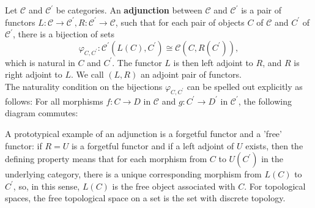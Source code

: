 Let $\mathcal{C}$ and $\mathcal{C}^{\prime}$ be categories. An \textbf{adjunction} between $\mathcal{C}$ and $\mathcal{C}^{\prime}$ is a pair of functors $L: \mathcal{C} \rightarrow \mathcal{C}^{\prime}, R: \mathcal{C}^{\prime} \rightarrow \mathcal{C}$, such that for each pair of objects $C$ of $\mathcal{C}$ and $C^{\prime}$ of $\mathcal{C}^{\prime}$, there is a bijection of sets
$$
\varphi_{C, C^{\prime}}: \mathcal{C}^{\prime}\left(L(C), C^{\prime}\right) \cong \mathcal{C}\left(C, R\left(C^{\prime}\right)\right),
$$
which is natural in $C$ and $C^{\prime}$. The functor $L$ is then left adjoint to $R$, and $R$ is right adjoint to $L$. We call $(L, R)$ an adjoint pair of functors.\\
The naturality condition on the bijections $\varphi_{C, C^{\prime}}$ can be spelled out explicitly as follows: For all morphisms $f: C \rightarrow D$ in $\mathcal{C}$ and $g: C^{\prime} \rightarrow D^{\prime}$ in $\mathcal{C}^{\prime}$, the following diagram commutes:
\begin{center}
\end{center}


\begin{example}
A prototypical example of an adjunction is a forgetful functor and a 'free' functor: if $R=U$ is a forgetful functor and if a left adjoint of $U$ exists, then the defining property means that for each morphism from $C$ to $U\left(C^{\prime}\right)$ in the underlying category, there is a unique corresponding morphism from $L(C)$ to $C^{\prime}$, so, in this sense, $L(C)$ is the free object associated with $C$. For topological spaces, the free topological space on a set is the set with discrete topology.
\end{example}

